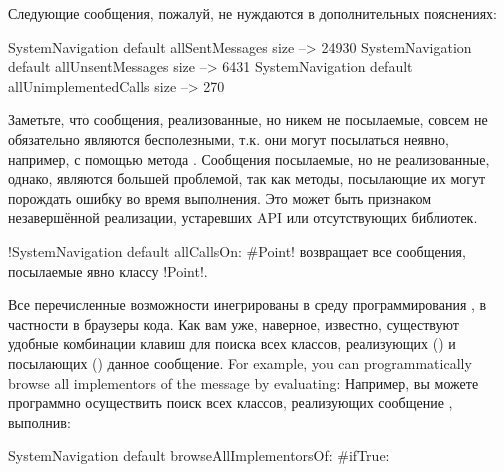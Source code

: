 \documentclass[a4paper,10pt,twoside]{book}
\begin{document}
{%
Следующие сообщения, пожалуй, не нуждаются в дополнительных пояснениях:

\begin{code}{}
SystemNavigation default allSentMessages size          --> 24930
SystemNavigation default allUnsentMessages size      --> 6431
SystemNavigation default allUnimplementedCalls size --> 270
\end{code}

Заметьте, что сообщения, реализованные, но никем не посылаемые, совсем не обязательно являются бесполезными, т.к. они могут посылаться неявно, например, с помощью метода .
Сообщения посылаемые, но не реализованные, однако, являются большей проблемой, так как методы, посылающие их могут порождать ошибку во время выполнения.
Это может быть признаком незавершённой реализации, устаревших API или отсутствующих библиотек.

\ct!SystemNavigation default allCallsOn: #Point! возвращает все сообщения, посылаемые явно классу \ct!Point!.

Все перечисленные возможности инегрированы в среду программирования \pharo, в частности в браузеры кода.
Как вам уже, наверное, известно, существуют удобные комбинации клавиш для поиска всех классов, реализующих () и посылающих () данное сообщение.
For example, you can programmatically browse all implementors of the message  by evaluating:
Например, вы можете программно осуществить поиск всех классов, реализующих сообщение , выполнив:
\begin{code}{}
SystemNavigation default browseAllImplementorsOf: #ifTrue:
\end{code}

}
\end{document}
